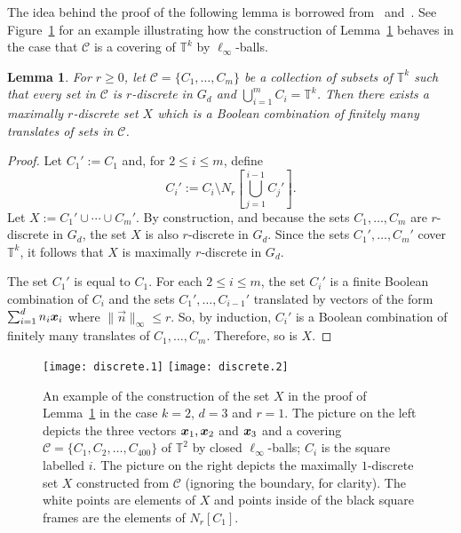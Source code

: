 \documentclass[12pt,a4paper]{amsart}
\numberwithin{equation}{section}
\newtheorem{lemma}[equation]{Lemma}
\theoremstyle{definition}
\begin{document}
The idea behind the proof of the following lemma is borrowed from~\cite[Lemma~3.2]{GrabowskiMathePikhurko17} and~\cite[p.~601]{MarksUnger17}. See Figure~\ref{fig:discrete} for an example illustrating how the construction of Lemma~\ref{outline:lem:simpleDiscrete} behaves in the case that $\mathcal{C}$ is a covering of $\mathbb{T}^k$ by $\ell_\infty$-balls.  

\begin{lemma}
\label{outline:lem:simpleDiscrete}
For $r\geq0$, let $\mathcal{C}=\{C_1,\dots,C_m\}$ be a collection of subsets of $\mathbb{T}^k$ such that every set in $\mathcal{C}$ is $r$-discrete in $G_d$ and $\bigcup_{i=1}^mC_i = \mathbb{T}^k$. Then there exists a maximally $r$-discrete set $X$ which is a Boolean combination of finitely many translates of sets in $\mathcal{C}$.
\end{lemma}

\begin{proof}
Let $C_1':=C_1$ and, for $2\leq i\leq m$, define
\[C_i':=C_i \setminus N_r\left[\bigcup_{j=1}^{i-1}C_j'\right].\]
Let $X:=C_1'\cup\cdots \cup C_m'$. By construction, and because the sets $C_1,\dots,C_m$ are $r$-discrete in $G_d$, the set $X$ is also $r$-discrete in $G_d$. Since the sets $C_1',\dots,C_m'$ cover $\mathbb{T}^k$, it follows that $X$ is maximally $r$-discrete in $G_d$. 

The set $C_1'$ is equal to $C_1$. For each $2\leq i\leq m$, the set $C_i'$ is a finite Boolean combination of $C_i$ and the sets $C_1',\dots,C_{i-1}'$ translated by vectors of the form $\sum_{i=1}^d n_i\boldsymbol{x}_i$ where $\|\vec{n}\|_\infty\leq r$.  So, by induction, $C_i'$ is a Boolean combination of finitely many translates of $C_1,\dots,C_m$. Therefore, so is $X$. 
\end{proof}




\begin{figure}[htbp]
\begin{center}
\texttt{[image: discrete.1]}
\hspace{0.5cm}
\texttt{[image: discrete.2]}
\end{center}
\caption{An example of the construction of the set $X$ in the proof of Lemma~\ref{outline:lem:simpleDiscrete} in the case $k=2$, $d=3$ and $r=1$. The picture on the left depicts the three vectors $\boldsymbol{x}_1,\boldsymbol{x}_2$ and $\boldsymbol{x}_3$ and a covering $\mathcal{C}=\{C_1,C_2,\dots,C_{400}\}$ of $\mathbb{T}^2$ by closed $\ell_\infty$-balls; $C_i$ is the square labelled $i$. The picture on the right depicts the maximally $1$-discrete set $X$ constructed from $\mathcal{C}$ (ignoring the boundary, for clarity). The white points are elements of $X$ and points inside of the black square frames are the elements of $N_r[C_1]$.}
\label{fig:discrete}
\end{figure}
\end{document}
